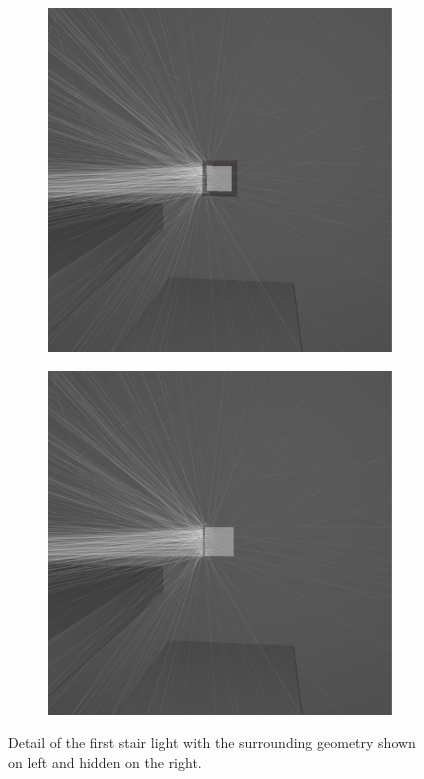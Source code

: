 \begin{figure}
	\centering
	\begin{subfigure}[t]{0.49\linewidth}
		\includegraphics[width=\textwidth]{chapters/chapter_results/b_light}
	\end{subfigure}
	\begin{subfigure}[t]{0.49\linewidth}
		\includegraphics[width=\textwidth]{chapters/chapter_results/b_lightoff}
	\end{subfigure}

	\caption{Detail of the first stair light with the surrounding geometry shown on left and hidden on the right.}
	\label{couple2light}
\end{figure}

